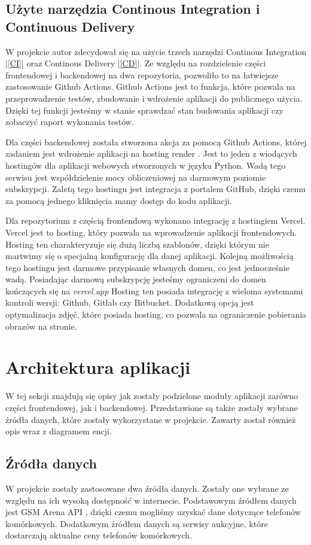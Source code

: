 \subsection{Użyte narzędzia Continous Integration i Continuous Delivery}
W projekcie autor zdecydował się na użycie trzech narzędzi Continous Integration |\ref{CI}| oraz Continous Delivery |\ref{CD}|. Ze względu na rozdzielenie części frontendowej i backendowej na dwa repozytoria, pozwoliło to na łatwiejsze zastosowanie Github Actions. Github Actions \cite{github_actions} jest to funkcja, które pozwala na przeprowadzenie testów, zbudowanie i wdrożenie aplikacji do publicznego użycia. Dzięki tej funkcji jesteśmy w stanie sprawdzać stan budowania aplikacji czy zobaczyć raport wykonania testów.

Dla części backendowej została stworzona akcja za pomocą Github Actions, której zadaniem jest wdrożenie aplikacji na hosting render \cite{render}. Jest to jeden z wiodących hostingów \cite{render_top} dla aplikacji webowych stworzonych w języku Python. Wadą tego serwisu jest współdzielenie mocy obliczeniowej na darmowym poziomie subskrypcji. Zaletą tego hostingu jest integracja z portalem GitHub, dzięki czemu za pomocą jednego kliknięcia mamy dostęp do kodu aplikacji.

Dla repozytorium z częścią frontendową wykonano integrację z hostingiem Vercel. Vercel \cite{vercel} jest to hosting, który pozwala na wprowadzenie aplikacji frontendowych. Hosting ten charakteryzuje się dużą liczbą szablonów, dzięki którym nie martwimy się o specjalną konfigurację dla danej aplikacji. Kolejną możliwością tego hostingu jest darmowe przypisanie własnych domen, co jest jednocześnie wadą. Posiadając darmową subskrypcję jesteśmy ograniczeni do domen kończących się na \textit{vercel.app} Hosting ten posiada integrację z wieloma systemami kontroli wersji: Github, Gitlab czy Bitbucket. Dodatkową opcją jest optymalizacja zdjęć, które posiada hosting, co pozwala na ograniczenie pobierania obrazów na stronie.

\section{Architektura aplikacji}
W tej sekcji znajdują się opisy jak zostały podzielone moduły aplikacji zarówno części frontendowej, jak i backendowej. Przedstawione są także zostały wybrane źródła danych, które zostały wykorzystane w projekcie. Zawarty został również opis wraz z diagramem encji.

\subsection{Źródła danych}\label{data_sources}
W projekcie zostały zastosowane dwa źródła danych. Zostały one wybrane ze względu na ich wysoką dostępność w internecie.
Podstawowym źródłem danych jest \linebreak GSM Arena API \cite{gsm_arena_api}, dzięki czemu mogliśmy uzyskać dane dotyczące telefonów komórkowych. Dodatkowym źródłem danych są serwisy aukcyjne, które dostarczają aktualne ceny telefonów komórkowych.

